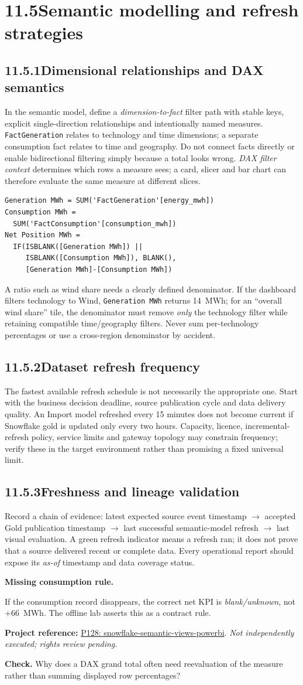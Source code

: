 \documentclass[11pt,twoside]{article}
\newcommand{\topic}[2]{\subsection*{#1\quad #2}}
\newcommand{\repo}[2]{\par\begingroup\fontsize{8.0}{9.6}\selectfont\sffamily\color{inkgray}\textbf{Project reference:} \href{#2}{#1}. \textit{Not independently executed; rights review pending.}\par\endgroup}
\begin{document}
\section*{11.5\quad Semantic modelling and refresh strategies}
\topic{11.5.1}{Dimensional relationships and DAX semantics}
In the semantic model, define a \emph{dimension-to-fact} filter path with stable keys, explicit single-direction relationships and intentionally named measures. \texttt{FactGeneration} relates to technology and time dimensions; a separate consumption fact relates to time and geography. Do not connect facts directly or enable bidirectional filtering simply because a total looks wrong. \emph{DAX filter context} determines which rows a measure sees; a card, slicer and bar chart can therefore evaluate the same measure at different slices.
\begin{lstlisting}[caption={Illustrative DAX, not evaluated by the offline tests.}]
Generation MWh = SUM('FactGeneration'[energy_mwh])
Consumption MWh =
  SUM('FactConsumption'[consumption_mwh])
Net Position MWh =
  IF(ISBLANK([Generation MWh]) ||
     ISBLANK([Consumption MWh]), BLANK(),
     [Generation MWh]-[Consumption MWh])
\end{lstlisting}
A ratio such as wind share needs a clearly defined denominator. If the dashboard filters technology to Wind, \texttt{Generation MWh} returns 14~MWh; for an ``overall wind share'' tile, the denominator must remove \emph{only} the technology filter while retaining compatible time/geography filters. Never sum per-technology percentages or use a cross-region denominator by accident.
\topic{11.5.2}{Dataset refresh frequency}
The fastest available refresh schedule is not necessarily the appropriate one. Start with the business decision deadline, source publication cycle and data delivery quality. An Import model refreshed every 15 minutes does not become current if Snowflake gold is updated only every two hours. Capacity, licence, incremental-refresh policy, service limits and gateway topology may constrain frequency; verify these in the target environment rather than promising a fixed universal limit.
\topic{11.5.3}{Freshness and lineage validation}
Record a chain of evidence: latest expected source event timestamp $\to$ accepted Gold publication timestamp $\to$ last successful semantic-model refresh $\to$ last visual evaluation. A green refresh indicator means a refresh ran; it does not prove that a source delivered recent or complete data. Every operational report should expose its \emph{as-of} timestamp and data coverage status.
\begin{insight}\textbf{Missing consumption rule.}\par
If the consumption record disappears, the correct net KPI is \emph{blank/unknown}, not +66~MWh. The offline lab asserts this as a contract rule.\end{insight}
\repo{P128: snowflake-semantic-views-powerbi}{https://github.com/alexfrancisross/snowflake-semantic-views-powerbi}
\textbf{Check.} Why does a DAX grand total often need reevaluation of the measure rather than summing displayed row percentages?
\newpage
\end{document}
